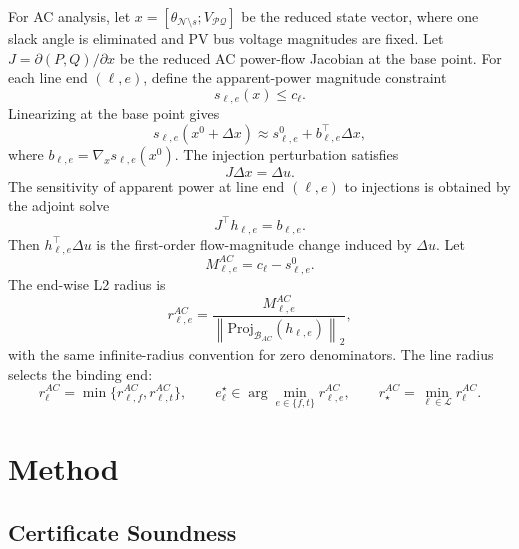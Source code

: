 \documentclass[11pt]{article}
\newcommand{\norm}[1]{\left\lVert #1 \right\rVert}
\newcommand{\Proj}{\mathrm{Proj}}
\begin{document}
For AC analysis, let $x=[\theta_{\mathcal{N}\setminus s};V_{\mathcal{PQ}}]$ be the reduced state vector, where one slack angle is eliminated and PV bus voltage magnitudes are fixed. Let $J=\partial(P,Q)/\partial x$ be the reduced AC power-flow Jacobian at the base point. For each line end $(\ell,e)$, define the apparent-power magnitude constraint
\begin{equation}
  s_{\ell,e}(x) \le c_\ell.
\end{equation}
Linearizing at the base point gives
\begin{equation}
  s_{\ell,e}(x^0+\Delta x)
  \approx
  s^0_{\ell,e}
  +
  b_{\ell,e}^\top \Delta x,
\end{equation}
where $b_{\ell,e}=\nabla_x s_{\ell,e}(x^0)$. The injection perturbation satisfies
\begin{equation}
  J\Delta x=\Delta u.
\end{equation}
The sensitivity of apparent power at line end $(\ell,e)$ to injections is obtained by the adjoint solve
\begin{equation}
  J^\top h_{\ell,e}=b_{\ell,e}.
\end{equation}
Then $h_{\ell,e}^\top \Delta u$ is the first-order flow-magnitude change induced by $\Delta u$. Let
\begin{equation}
  M_{\ell,e}^{AC}=c_\ell-s^0_{\ell,e}.
\end{equation}
The end-wise L2 radius is
\begin{equation}
  r_{\ell,e}^{AC} = \frac{M_{\ell,e}^{AC}}{\norm{\Proj_{\mathcal{B}_{AC}}(h_{\ell,e})}_2},
\end{equation}
with the same infinite-radius convention for zero denominators. The line radius selects the binding end:
\begin{equation}
  r_\ell^{AC}=\min\{r_{\ell,f}^{AC},r_{\ell,t}^{AC}\},
  \qquad
  e_\ell^\star\in\arg\min_{e\in\{f,t\}}r_{\ell,e}^{AC},
  \qquad
  r_\star^{AC}=\min_{\ell\in\mathcal{L}}r_\ell^{AC}.
\end{equation}

\section{Method}
\label{sec:method}

\subsection{Certificate Soundness}
\end{document}
